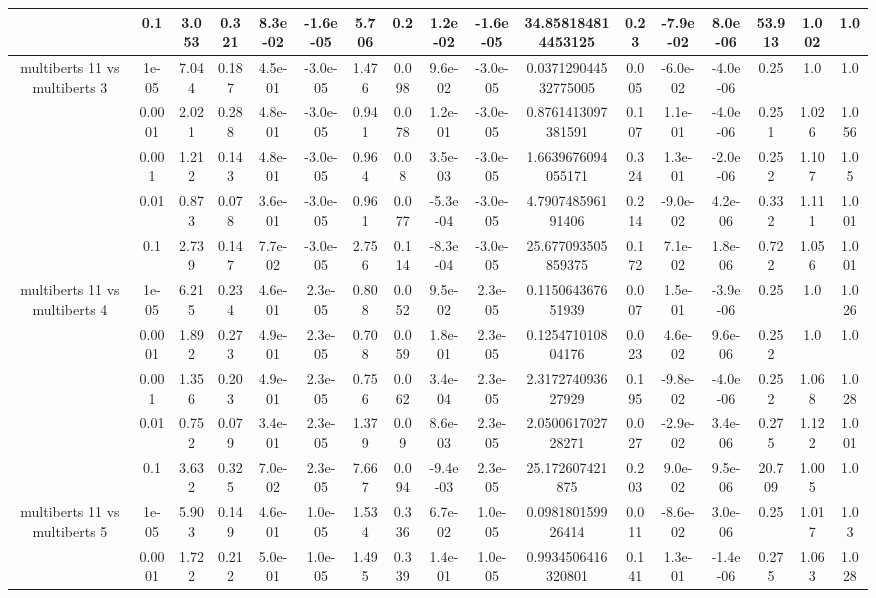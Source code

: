 \begin{tabular}{|c|c|c|c|c|c|c|c|c|c|c|c|c|c|c|c|c|}
 & 0.1 & 3.053 & 0.321 & 8.3e-02 & -1.6e-05 & 5.706 & 0.2 & 1.2e-02 & -1.6e-05 & 34.858184814453125 & 0.23 & -7.9e-02 & 8.0e-06 & 53.913 & 1.002 & 1.0 \\
\hline
\multirow{5}{*}{multiberts 11 vs multiberts 3} & 1e-05 & 7.044 & 0.187 & 4.5e-01 & -3.0e-05 & 1.476 & 0.098 & 9.6e-02 & -3.0e-05 & 0.037129044532775005 & 0.005 & -6.0e-02 & -4.0e-06 & 0.25 & 1.0 & 1.0 \\
 & 0.0001 & 2.021 & 0.288 & 4.8e-01 & -3.0e-05 & 0.941 & 0.078 & 1.2e-01 & -3.0e-05 & 0.8761413097381591 & 0.107 & 1.1e-01 & -4.0e-06 & 0.251 & 1.026 & 1.056 \\
 & 0.001 & 1.212 & 0.143 & 4.8e-01 & -3.0e-05 & 0.964 & 0.08 & 3.5e-03 & -3.0e-05 & 1.6639676094055171 & 0.324 & 1.3e-01 & -2.0e-06 & 0.252 & 1.107 & 1.05 \\
 & 0.01 & 0.873 & 0.078 & 3.6e-01 & -3.0e-05 & 0.961 & 0.077 & -5.3e-04 & -3.0e-05 & 4.790748596191406 & 0.214 & -9.0e-02 & 4.2e-06 & 0.332 & 1.111 & 1.001 \\
 & 0.1 & 2.739 & 0.147 & 7.7e-02 & -3.0e-05 & 2.756 & 0.114 & -8.3e-04 & -3.0e-05 & 25.677093505859375 & 0.172 & 7.1e-02 & 1.8e-06 & 0.722 & 1.056 & 1.001 \\
\hline
\multirow{5}{*}{multiberts 11 vs multiberts 4} & 1e-05 & 6.215 & 0.234 & 4.6e-01 & 2.3e-05 & 0.808 & 0.052 & 9.5e-02 & 2.3e-05 & 0.115064367651939 & 0.007 & 1.5e-01 & -3.9e-06 & 0.25 & 1.0 & 1.026 \\
 & 0.0001 & 1.892 & 0.273 & 4.9e-01 & 2.3e-05 & 0.708 & 0.059 & 1.8e-01 & 2.3e-05 & 0.125471010804176 & 0.023 & 4.6e-02 & 9.6e-06 & 0.252 & 1.0 & 1.0 \\
 & 0.001 & 1.356 & 0.203 & 4.9e-01 & 2.3e-05 & 0.756 & 0.062 & 3.4e-04 & 2.3e-05 & 2.317274093627929 & 0.195 & -9.8e-02 & -4.0e-06 & 0.252 & 1.068 & 1.028 \\
 & 0.01 & 0.752 & 0.079 & 3.4e-01 & 2.3e-05 & 1.379 & 0.09 & 8.6e-03 & 2.3e-05 & 2.050061702728271 & 0.027 & -2.9e-02 & 3.4e-06 & 0.275 & 1.122 & 1.001 \\
 & 0.1 & 3.632 & 0.325 & 7.0e-02 & 2.3e-05 & 7.667 & 0.094 & -9.4e-03 & 2.3e-05 & 25.172607421875 & 0.203 & 9.0e-02 & 9.5e-06 & 20.709 & 1.005 & 1.0 \\
\hline
\multirow{5}{*}{multiberts 11 vs multiberts 5} & 1e-05 & 5.903 & 0.149 & 4.6e-01 & 1.0e-05 & 1.534 & 0.336 & 6.7e-02 & 1.0e-05 & 0.098180159926414 & 0.011 & -8.6e-02 & 3.0e-06 & 0.25 & 1.017 & 1.03 \\
 & 0.0001 & 1.722 & 0.212 & 5.0e-01 & 1.0e-05 & 1.495 & 0.339 & 1.4e-01 & 1.0e-05 & 0.9934506416320801 & 0.141 & 1.3e-01 & -1.4e-06 & 0.275 & 1.063 & 1.028 \\

\end{tabular}
